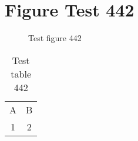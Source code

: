 \documentclass{article}
\begin{document}
\section{Figure Test 442}
\begin{figure}[h]
\caption{Test figure 442}
\end{figure}
\begin{table}[h]
\caption{Test table 442}
\begin{tabular}{cc}
A & B \\
1 & 2
\end{tabular}
\end{table}
\end{document}

